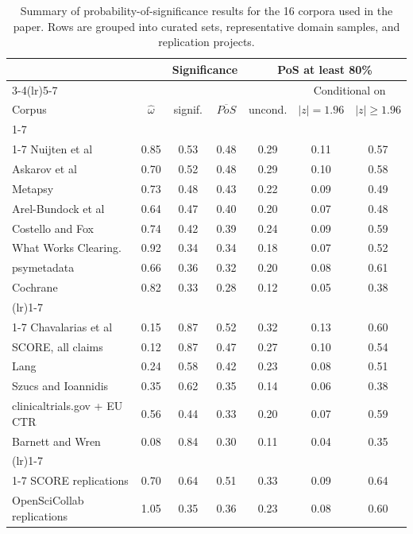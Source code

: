 \begin{table}
\centering
\small
\begin{tabular}{lcccccc}
\multicolumn{2}{c}{}
& \multicolumn{2}{c}{Significance}
& \multicolumn{3}{c}{PoS at least 80\%} \\
\cmidrule(lr){3-4}\cmidrule(lr){5-7}
& & & & & \multicolumn{2}{c}{\scriptsize Conditional on} \\
Corpus & \multicolumn{1}{c}{\scriptsize $\hat\omega$}
        & \multicolumn{1}{c}{\scriptsize signif.}
        & \multicolumn{1}{c}{\scriptsize $\overline{PoS}$}
        & \multicolumn{1}{c}{\scriptsize uncond.}
        & \multicolumn{1}{c}{\scriptsize $|z| = 1.96$}
        & \multicolumn{1}{c}{\scriptsize $|z| \geq 1.96$} \\
\cmidrule(lr){1-7}
\multicolumn{7}{l}{\emph{Curated sets}}\\
\cmidrule(lr){1-7}
Nuijten et al & 0.85 & 0.53 & 0.48 & 0.29 & 0.11 & 0.57\\
Askarov et al & 0.70 & 0.52 & 0.48 & 0.29 & 0.10 & 0.58\\
Metapsy & 0.73 & 0.48 & 0.43 & 0.22 & 0.09 & 0.49\\
Arel-Bundock et al & 0.64 & 0.47 & 0.40 & 0.20 & 0.07 & 0.48\\
Costello and Fox & 0.74 & 0.42 & 0.39 & 0.24 & 0.09 & 0.59\\
What Works Clearing. & 0.92 & 0.34 & 0.34 & 0.18 & 0.07 & 0.52\\
psymetadata & 0.66 & 0.36 & 0.32 & 0.20 & 0.08 & 0.61\\
Cochrane & 0.82 & 0.33 & 0.28 & 0.12 & 0.05 & 0.38\\
\addlinespace
\cmidrule(lr){1-7}
\multicolumn{7}{l}{\emph{Representative domain samples}}\\
\cmidrule(lr){1-7}
Chavalarias et al & 0.15 & 0.87 & 0.52 & 0.32 & 0.13 & 0.60\\
SCORE, all claims & 0.12 & 0.87 & 0.47 & 0.27 & 0.10 & 0.54\\
Lang & 0.24 & 0.58 & 0.42 & 0.23 & 0.08 & 0.51\\
Szucs and Ioannidis & 0.35 & 0.62 & 0.35 & 0.14 & 0.06 & 0.38\\
clinicaltrials.gov + EU CTR & 0.56 & 0.44 & 0.33 & 0.20 & 0.07 & 0.59\\
Barnett and Wren & 0.08 & 0.84 & 0.30 & 0.11 & 0.04 & 0.35\\
\addlinespace
\cmidrule(lr){1-7}
\multicolumn{7}{l}{\emph{Replication efforts}}\\
\cmidrule(lr){1-7}
SCORE replications & 0.70 & 0.64 & 0.51 & 0.33 & 0.09 & 0.64\\
OpenSciCollab replications & 1.05 & 0.35 & 0.36 & 0.23 & 0.08 & 0.60\\
\bottomrule
\end{tabular}
\caption{Summary of probability-of-significance results for the 16 corpora used in the paper. Rows are grouped into curated sets, representative domain samples, and replication projects.}
\label{tab:results_summary_table3}
\end{table}
